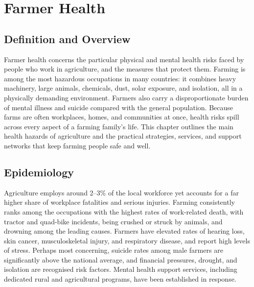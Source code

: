 \chapter{Farmer Health}

\section*{Definition and Overview}
Farmer health concerns the particular physical and mental health risks faced by people who work in agriculture, and the measures that protect them. Farming is among the most hazardous occupations in many countries: it combines heavy machinery, large animals, chemicals, dust, solar exposure, and isolation, all in a physically demanding environment. Farmers also carry a disproportionate burden of mental illness and suicide compared with the general population. Because farms are often workplaces, homes, and communities at once, health risks spill across every aspect of a farming family's life. This chapter outlines the main health hazards of agriculture and the practical strategies, services, and support networks that keep farming people safe and well.

\section*{Epidemiology}
Agriculture employs around 2--3\% of the local workforce yet accounts for a far higher share of workplace fatalities and serious injuries. Farming consistently ranks among the occupations with the highest rates of work-related death, with tractor and quad-bike incidents, being crushed or struck by animals, and drowning among the leading causes. Farmers have elevated rates of hearing loss, skin cancer, musculoskeletal injury, and respiratory disease, and report high levels of stress. Perhaps most concerning, suicide rates among male farmers are significantly above the national average, and financial pressures, drought, and isolation are recognised risk factors. Mental health support services, including dedicated rural and agricultural programs, have been established in response.

